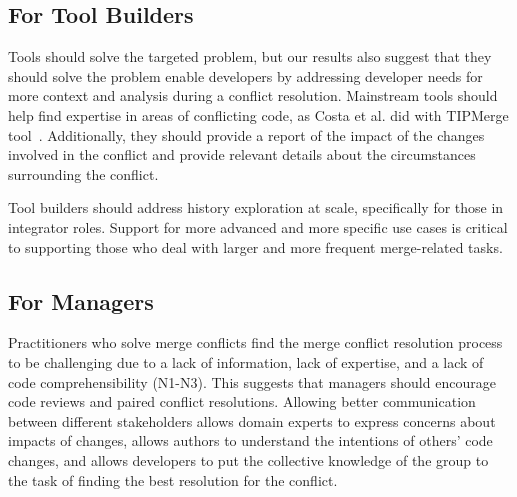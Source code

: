 
\subsection{For Tool Builders}
Tools should solve the targeted problem, but our results also suggest that they should solve the problem enable developers by addressing developer needs for more context and analysis during a conflict resolution. Mainstream tools should help find expertise in areas of conflicting code, as Costa et al. did with TIPMerge tool~\cite{CostaSarma}. Additionally, they should provide a report of the impact of the changes involved in the conflict and provide relevant details about the circumstances surrounding the conflict.

Tool builders should address history exploration at scale, specifically for those in integrator roles. Support for more advanced and more specific use cases is critical to supporting those who deal with larger and more frequent merge-related tasks.

\subsection{For Managers}
Practitioners who solve merge conflicts find the merge conflict resolution process to be challenging due to a lack of information, lack of expertise, and a lack of code comprehensibility (N1-N3). This suggests that managers should encourage code reviews and paired conflict resolutions. Allowing better communication between different stakeholders allows domain experts to express concerns about impacts of changes, allows authors to understand the intentions of others' code changes, and allows developers to put the collective knowledge of the group to the task of finding the best resolution for the conflict.